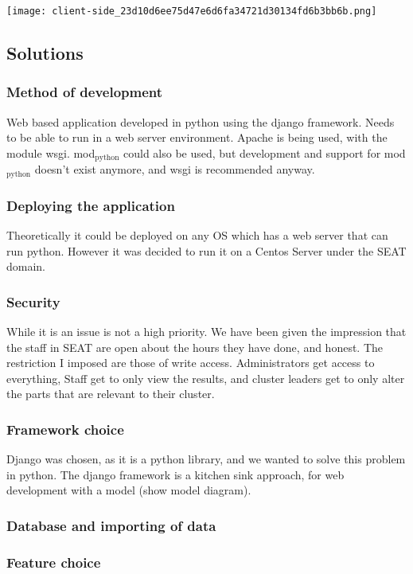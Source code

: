 \documentclass[11pt]{article}
\begin{document}
\texttt{[image: client-side\_23d10d6ee75d47e6d6fa34721d30134fd6b3bb6b.png]}
\subsection{Solutions}
\label{sec-2_3}
\subsubsection{Method of development}
\label{sec-2_3_1}

Web based application developed in python using the django framework.
Needs to be able to run in a web server environment.  Apache is being
used, with the module wsgi. mod$_{\mathrm{python}}$ could also be used, but
development and support for mod$_{\mathrm{python}}$ doesn't exist anymore, and wsgi
is recommended anyway.
\subsubsection{Deploying the application}
\label{sec-2_3_2}

Theoretically it could be deployed on any OS which has a web server
that can run python. However it was decided to run it on a Centos
Server under the SEAT domain.
\subsubsection{Security}
\label{sec-2_3_3}

While it is an issue is not a high priority.  We have been
given the impression that the staff in SEAT are open about the hours
they have done, and honest.  The restriction I imposed are those of
write access.  Administrators get access to everything, Staff get to
only view the results, and cluster leaders get to only alter the parts
that are relevant to their cluster.
\subsubsection{Framework choice}
\label{sec-2_3_4}

Django was chosen, as it is a python library, and we wanted to solve
this problem in python.  The django framework is a kitchen sink
approach, for web development with a model (show model diagram).
\subsubsection{Database and importing of data}
\label{sec-2_3_5}
\subsubsection{Feature choice}
\label{sec-2_3_6}
\end{document}
